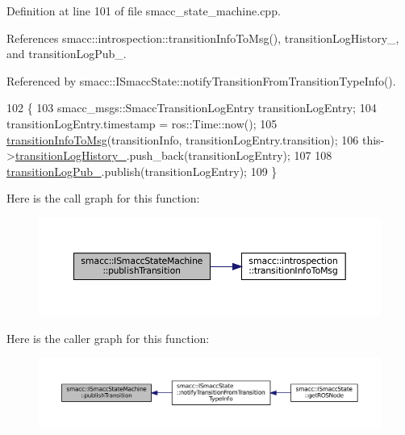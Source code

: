 Definition at line 101 of file smacc\+\_\+state\+\_\+machine.\+cpp.



References smacc\+::introspection\+::transition\+Info\+To\+Msg(), transition\+Log\+History\+\_\+, and transition\+Log\+Pub\+\_\+.



Referenced by smacc\+::\+I\+Smacc\+State\+::notify\+Transition\+From\+Transition\+Type\+Info().


\begin{DoxyCode}
102 \{
103     smacc\_msgs::SmaccTransitionLogEntry transitionLogEntry;
104     transitionLogEntry.timestamp = ros::Time::now();
105     \hyperlink{namespacesmacc_1_1introspection_a6c1b51c4d44fd5e41fe218f1ee150681}{transitionInfoToMsg}(transitionInfo, transitionLogEntry.transition);
106     this->\hyperlink{classsmacc_1_1ISmaccStateMachine_af682d5fce5bb7c959e2b8814dae50023}{transitionLogHistory\_}.push\_back(transitionLogEntry);
107 
108     \hyperlink{classsmacc_1_1ISmaccStateMachine_acc42eb050325c1edc77d81675fb1286a}{transitionLogPub\_}.publish(transitionLogEntry);
109 \}
\end{DoxyCode}
Here is the call graph for this function\+:
\nopagebreak
\begin{figure}[H]
\begin{center}
\leavevmode
\includegraphics[width=350pt]{classsmacc_1_1ISmaccStateMachine_a06cc53c282c93692829b6efd28e315f4_cgraph}
\end{center}
\end{figure}
Here is the caller graph for this function\+:
\nopagebreak
\begin{figure}[H]
\begin{center}
\leavevmode
\includegraphics[width=350pt]{classsmacc_1_1ISmaccStateMachine_a06cc53c282c93692829b6efd28e315f4_icgraph}
\end{center}
\end{figure}
\mbox{\label{classsmacc_1_1ISmaccStateMachine_aa6b25e28f3bce24c4b356dc865a9eb7b}} 
